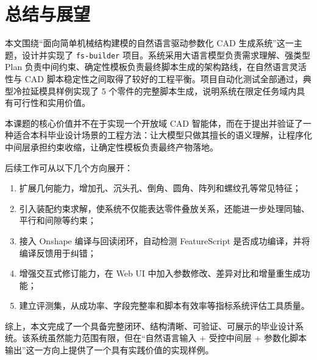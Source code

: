 \section{总结与展望}

本文围绕“面向简单机械结构建模的自然语言驱动参数化 CAD 生成系统”这一主题，设计并实现了 \texttt{fs-builder} 项目。系统采用大语言模型负责需求理解、强类型 Plan 负责中间约束、确定性模板负责最终脚本生成的架构路线，在自然语言灵活性与 CAD 脚本稳定性之间取得了较好的工程平衡。项目自动化测试全部通过，典型冷拉延模具样例实现了 5 个零件的完整脚本生成，说明系统在限定任务域内具有可行性和实用价值。

本课题的核心价值并不在于实现一个开放域 CAD 智能体，而在于提出并验证了一种适合本科毕业设计场景的工程方法：让大模型只做其擅长的语义理解，让程序化中间层承担约束收缩，让确定性模板负责最终产物落地。

后续工作可从以下几个方向展开：
\begin{enumerate}[leftmargin=2em]
  \item 扩展几何能力，增加孔、沉头孔、倒角、圆角、阵列和螺纹孔等常见特征；
  \item 引入装配约束求解，使系统不仅能表达零件叠放关系，还能进一步处理同轴、平行和间隙等约束；
  \item 接入 Onshape 编译与回读闭环，自动检测 FeatureScript 是否成功编译，并将编译反馈用于纠错；
  \item 增强交互式修订能力，在 Web UI 中加入参数修改、差异对比和增量重生成功能；
  \item 建立评测集，从成功率、字段完整率和脚本有效率等指标系统评估工具质量。
\end{enumerate}

综上，本文完成了一个具备完整闭环、结构清晰、可验证、可展示的毕业设计系统。该系统虽然能力范围有限，但在“自然语言输入 + 受控中间层 + 参数化脚本输出”这一方向上提供了一个具有实践价值的实现样例。
